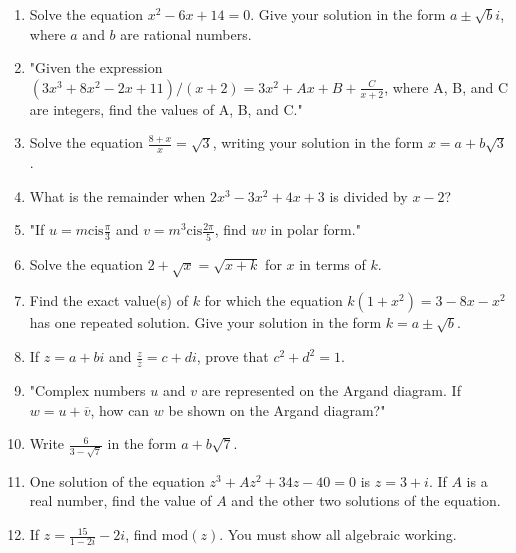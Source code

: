 \documentclass{article}
\begin{document}
\begin{enumerate}
\vspace{3cm}
\item Solve the equation \( x^2 - 6x + 14 = 0 \). Give your solution in the form \( a \pm \sqrt{b}i \), where \( a \) and \( b \) are rational numbers.
\vspace{3cm}
\item "Given the expression \((3x^3 + 8x^2 - 2x + 11) / (x + 2) = 3x^2 + Ax + B + \frac{C}{x + 2}\), where A, B, and C are integers, find the values of A, B, and C."
\vspace{3cm}
\item Solve the equation \(\frac{8 + x}{x} = \sqrt{3}\), writing your solution in the form \(x = a + b\sqrt{3}\).
\vspace{3cm}
\item What is the remainder when \(2x^3 - 3x^2 + 4x + 3\) is divided by \(x - 2\)?
\vspace{3cm}
\item "If \( u = m \text{cis} \frac{\pi}{3} \) and \( v = m^3 \text{cis} \frac{2\pi}{5} \), find \( uv \) in polar form."
\vspace{3cm}
\item Solve the equation \(2 + \sqrt{x} = \sqrt{x + k}\) for \(x\) in terms of \(k\).
\vspace{3cm}
\item Find the exact value(s) of \( k \) for which the equation \( k(1 + x^2) = 3 - 8x - x^2 \) has one repeated solution. Give your solution in the form \( k = a \pm \sqrt{b} \).
\vspace{3cm}
\item If \( z = a + bi \) and \( \frac{z}{\overline{z}} = c + di \), prove that \( c^2 + d^2 = 1 \).
\vspace{3cm}
\item "Complex numbers \( u \) and \( v \) are represented on the Argand diagram. If \( w = u + \overline{v} \), how can \( w \) be shown on the Argand diagram?"
\vspace{3cm}
\item Write \( \frac{6}{3 - \sqrt{7}} \) in the form \( a + b\sqrt{7} \).
\vspace{3cm}
\item One solution of the equation \( z^3 + Az^2 + 34z - 40 = 0 \) is \( z = 3 + i \). If \( A \) is a real number, find the value of \( A \) and the other two solutions of the equation.
\vspace{3cm}
\item If \( z = \frac{15}{1 - 2i} - 2i \), find \(\text{mod}(z)\). You must show all algebraic working.

\end{enumerate}
\end{document}
